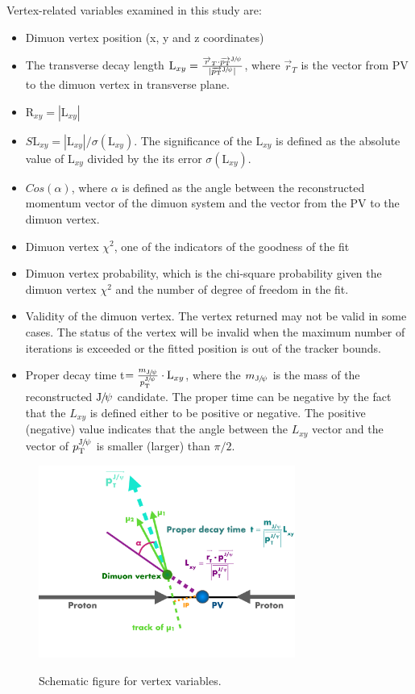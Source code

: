 Vertex-related variables examined in this study are: 
		\begin{itemize}
		\item Dimuon vertex position (x, y and z coordinates)
		\item The transverse decay length $\text{L}_{xy} = \frac{\overrightarrow{r}_{T}\cdot\overrightarrow{p_{\mathrm{T}}}^{{\mathrm{J}\hspace{-.08em}/\hspace{-.14em}\psi}}}{|\overrightarrow{p_{\mathrm{T}}}^{{\mathrm{J}\hspace{-.08em}/\hspace{-.14em}\psi}}|}$, where $\overrightarrow{r}_{T}$ is the vector from PV to the dimuon vertex in transverse plane. 
		\item $\text{R}_{xy} = |\text{L}_{xy}|$
		\item $S\text{L}_{xy} = |\text{L}_{xy}|/\sigma(\text{L}_{xy})$. The significance of the $\text{L}_{xy}$ is defined as the absolute value of $\text{L}_{xy}$ divided by the its error $\sigma(\text{L}_{xy})$. 
		\item $Cos(\alpha)$, where $\alpha$ is defined as the angle between the reconstructed momentum vector of the dimuon system and the vector from the PV to the dimuon vertex. 
		\item Dimuon vertex $\chi^{2}$, one of the indicators of the goodness of the fit
		\item Dimuon vertex probability, which is the chi-square probability given the dimuon vertex $\chi^{2}$ and the number of degree of freedom in the fit.
		\item Validity of the dimuon vertex. The vertex returned may not be valid in some cases. The status of the vertex will be invalid when the maximum number of iterations is exceeded or the fitted position is out of the tracker bounds.
		\item Proper decay time t$= \frac{m_{{\mathrm{J}\hspace{-.08em}/\hspace{-.14em}\psi}}}{p_{\mathrm{T}}^{{\mathrm{J}\hspace{-.08em}/\hspace{-.14em}\psi}}}\cdot \text{L}_{xy}$, where the $m_{{\mathrm{J}\hspace{-.08em}/\hspace{-.14em}\psi}}$ is the mass of the reconstructed ${\mathrm{J}\hspace{-.08em}/\hspace{-.14em}\psi}$ candidate. The proper time can be negative by the fact that the $L_{xy}$ is defined either to be positive or negative. The positive (negative) value indicates that the angle between the $L_{xy}$ vector and the vector of $p_{\mathrm{T}}^{{\mathrm{J}\hspace{-.08em}/\hspace{-.14em}\psi}}$ is smaller (larger) than $\pi /2$.
		\end{itemize}
		
		\begin{figure}[!ht]
		  \begin{center}  
		    \includegraphics[width=0.75\textwidth]{Fig/VertexVariables}\\
		    \caption{Schematic figure for vertex variables. \label{fig:BVtx}}  
		  \end{center}
		\end{figure}
		
